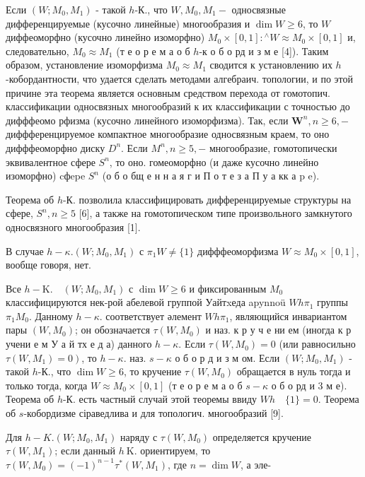 \documentclass[10pt]{article}
\begin{document}
Если $\left(W ; M_{0}, M_{1}\right)$ - такой $h$-К., что $W, M_{0}, M_{1}-$ односвязные дифференцируемые (кусочно линейные) многообразия и $\operatorname{dim} W \geqslant 6$, то $W$ диффеоморфно (кусочно линейно изоморфно) $M_{0} \times[0,1]:{ }^{\wedge} W \approx M_{0} \times[0,1]$ и, следовательно, $M_{0} \approx M_{1}$ (т е о р е м а о б $h$-к о б о рд и з м е [4]). Таким образом, установление изоморфизма $M_{0} \approx M_{1}$ сводится к установлению их $h$-кобордантности, что удается сделать методами алгебраич. топологии, и по этой причине эта теорема является основным средством перехода от гомотопич. классификации односвязных многообразий к их классификации с точностью до дифффеомо рфизма (кусочно линейного изоморфизма). Так, если $\boldsymbol{W}^{n}, n \geqslant 6,-$ диффференцируемое компактное многообразие односвязным краем, то оно дифффеоморфно диску $D^{n}$. Если $M^{n}, n \geqslant 5,-$ многообразие, гомотопически эквивалентное сфере $S^{n}$, то оно. гомеоморфно (и даже кусочно линейно изоморфно) cфepe $S^{n}$ (о б о бщ е н н а я г и П о т е з а П у а кк а p e).



Теорема об $h$-К. позволила классифицировать дифференцируемые структуры на сфере, $S^{n}, n \geqslant 5$ [6], а также на гомотопическом типе произвольного замкнутого односвязного многообразия [1].



В случае $h-\kappa .\left(W ; M_{0}, M_{1}\right)$ с $\pi_{1} W \neq\{1\}$ дифффеоморфизма $W \approx M_{0} \times[0,1]$, вообще говоря, нет.



Все $h-\mathrm{K} . \quad\left(W ; M_{0}, M_{1}\right)$ с $\operatorname{dim} W \geqslant 6$ и фиксированным $M_{0}$ классифицируются нек-рой абелевой группой Уайтxеда apynnoü $W h \pi_{1}$ группы $\pi_{1} M_{0}$. Данному $h-\kappa$. соответствует әлемент $W h \pi_{1}$, являющийся инвариантом пары $\left(W, M_{0}\right)$; он обозначается $\tau\left(W, M_{0}\right)$ и наз. к р у ч е ни ем (иногда к р учени е м У а й тх е д а) данного $h-\kappa$. Если $\tau\left(W, M_{0}\right)=0$ (или равносильно $\left.\tau\left(W, M_{1}\right)=0\right)$, то $h-\kappa$. наз. $s-\kappa$ о б о р д и з м ом. Если $\left(W ; M_{0}, M_{1}\right)$ - такой $h$-К., что $\operatorname{dim} W \geqslant 6$, то кручение $\tau\left(W, M_{0}\right)$ обращается в нуль тогда и только тогда, когда $W \approx M_{0} \times[0,1]$ (т е о р е м а о б $s-\kappa$ о б о рд и 3 м е). Теорема об $h$-К. есть частный случай этой теоремы ввиду $W h \quad\{1\}=0$. Теорема об $s$-кобордизме сіраведлива и для топологич. многообразий [9].



Для $h-K .\left(W ; M_{0}, M_{1}\right)$ наряду с $\tau\left(W, M_{0}\right)$ определяется кручение $\tau\left(W, M_{1}\right)$; если данный $h \mathrm{~K}$. ориентируем, то $\tau\left(W, M_{0}\right)=(-1)^{n-1} \tau^{*}\left(W, M_{1}\right)$, где $n=\operatorname{dim} W$, а эле-
\end{document}
